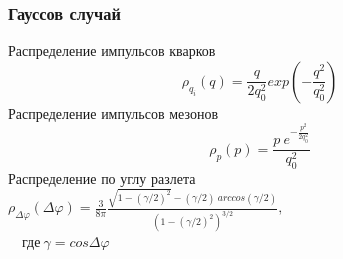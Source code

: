 \documentclass{beamer}
\renewcommand{\l}{\left( }
\renewcommand{\r}{\right) }
\renewcommand{\phi}{\varphi}
\newcommand{\br}[1]{\l {#1} \r}
\begin{document}
\begin{frame}[fragile]
\frametitle{Гауссов случай}
\begin{minipage}[h]{0.53\linewidth}
Распределение импульсов кварков
$$\rho_{q_i} \br{q} = \frac{q}{2 q_0^2} exp \br{-\frac{q^2}{q_0^2} }$$
$$$$
Распределение импульсов мезонов
$$\rho_p \br{p} = \frac{p \ e^{-\frac{p^2}{2q_0^2}}}{q_0^2} $$
Распределение по углу разлета \\
{\small
$\rho_{\Delta \phi} \br{\Delta \phi} = \frac{3}{8 \pi} \frac{\sqrt{1 - \br{\gamma / 2}^2} - \br{\gamma / 2} \ arccos \br{\gamma / 2}}{\br{1 - \br{\gamma/2}^2}^{3/2}},$ \\
$\quad \text{где} \ \gamma = cos \Delta \phi $
}
\end{minipage}
\begin{minipage}[h]{0.43\linewidth}
\end{minipage}
\end{frame}
\end{document}

